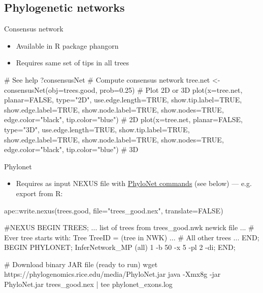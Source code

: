 \documentclass[compress, ucs, xelatex, 11pt, xcolor=x11names, aspectratio=169,
	hyperref={
		bookmarks=true,
		unicode=true,
		colorlinks=true,
		pdftitle={HybSeq course},
		plainpages=false,
		pdfauthor={Vojtech Zeisek},
		pdfsubject={Practical processing of HybSeq target enrichment sequencing data on computing grids like MetaCentrum},
		pdfcreator={XeLaTeX},
		pdfkeywords={BASH, command line, GNU, HybSeq, Linux, MetaCentrum, sequencing shell, target enrichment},
		linkcolor=Turquoise4, %
		anchorcolor=DodgerBlue4, %
		citecolor=DodgerBlue4, %
		filecolor=DodgerBlue4, %
		menucolor=Tan4, %
		urlcolor=DarkOliveGreen4, %
		pdftex},
	url={hyphens, lowtilde} %
	]{beamer}
\renewcommand{\texttt}[1]{\colorbox{Cornsilk2}{{\ttfamily #1}}}
\begin{document}
\subsection{Phylogenetic networks}

\begin{frame}[fragile]{Consensus network}
	\begin{itemize}
		\item Available in \texttt{R} package \texttt{phangorn}
		\item Requires same set of tips in all trees
	\end{itemize}
	\begin{spluscode}
    # See help
    ?consensusNet
    # Compute consensus network
    tree.net <- consensusNet(obj=trees.good, prob=0.25)
    # Plot 2D or 3D
    plot(x=tree.net, planar=FALSE, type="2D", use.edge.length=TRUE,
      show.tip.label=TRUE, show.edge.label=TRUE, show.node.label=TRUE,
      show.nodes=TRUE, edge.color="black", tip.color="blue") # 2D
    plot(x=tree.net, planar=FALSE, type="3D", use.edge.length=TRUE,
      show.tip.label=TRUE, show.edge.label=TRUE, show.node.label=TRUE,
      show.nodes=TRUE, edge.color="black", tip.color="blue") # 3D
	\end{spluscode}
\end{frame}

\begin{frame}[fragile]{Phylonet}
	\begin{itemize}
		\item Requires as input NEXUS file with \href{https://wiki.rice.edu/confluence/display/PHYLONET/List+of+PhyloNet+Commands}{PhyloNet commands} (see below) --- e.g. export from \texttt{R}:
	\end{itemize}
	\begin{spluscode}
    ape::write.nexus(trees.good, file="trees_good.nex", translate=FALSE)
	\end{spluscode}
	\begin{bashcode}
    #NEXUS
    BEGIN TREES;
    ... list of trees from trees_good.nwk newick file ...
    # Ever tree starts with:
    Tree TreeID = (tree in NWK)
    ... # All other trees ...
    END;
    BEGIN PHYLONET;
    InferNetwork_MP (all) 1 -b 50 -x 5 -pl 2 -di;
    END;

    # Download binary JAR file (ready to run)
    wget https://phylogenomics.rice.edu/media/PhyloNet.jar
    java -Xmx8g -jar PhyloNet.jar trees_good.nex | tee phylonet_exons.log
	\end{bashcode}
\end{frame}
\end{document}
